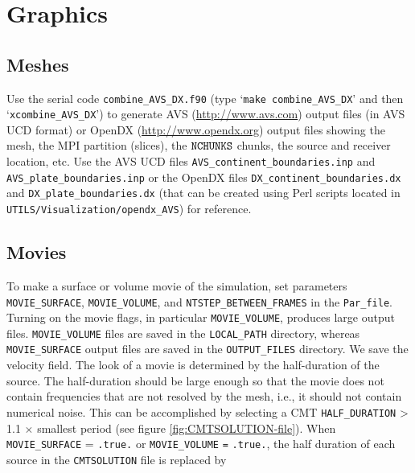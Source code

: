 \documentclass[oneside,english]{book}
\newcommand{\urlwithparentheses}[1]{(\url{#1})}
\newcommand{\nchunks}{\mbox{\texttt{NCHUNKS}}}
\begin{document}


\chapter{\label{cha:graphics}Graphics}


\section{\label{sec:Meshes}Meshes}

Use the serial code \texttt{combine\_AVS\_DX.f90} (type `\texttt{make
combine\_AVS\_DX}' and then `\texttt{xcombine\_AVS\_DX}') to generate
AVS \urlwithparentheses{http://www.avs.com} output files (in AVS UCD format) or OpenDX \urlwithparentheses{http://www.opendx.org}
output files showing the mesh, the MPI partition (slices), the $\nchunks$
chunks, the source and receiver location, etc. Use the AVS UCD files
\texttt{AVS\_continent\_boundaries.inp} and \texttt{AVS\_plate\_boundaries.inp}
or the OpenDX files \texttt{DX\_continent\_boundaries.dx} and \texttt{DX\_plate\_boundaries.dx}
(that can be created using Perl scripts located in \texttt{UTILS/Visualization/opendx\_AVS})
for reference.


\section{\label{sec:Movies}Movies}

To make a surface or volume movie of the simulation, set parameters
\texttt{MOVIE\_SURFACE}, \texttt{MOVIE\_VOLUME}, and \texttt{NTSTEP\_BETWEEN\_FRAMES}
in the \texttt{Par\_file}. Turning on the movie flags, in particular
\texttt{MOVIE\_VOLUME}, produces large output files. \texttt{MOVIE\_VOLUME}
files are saved in the \texttt{LOCAL\_PATH} directory, whereas \texttt{MOVIE\_SURFACE}
output files are saved in the \texttt{OUTPUT\_FILES} directory. We
save the velocity field. The look of a movie is determined by the
half-duration of the source. The half-duration should be large enough
so that the movie does not contain frequencies that are not resolved
by the mesh, i.e., it should not contain numerical noise. This can
be accomplished by selecting a CMT \texttt{HALF\_DURATION} > 1.1 $\times$
smallest period (see figure \ref{fig:CMTSOLUTION-file}). When \texttt{\small MOVIE\_SURFACE}
= \texttt{\small .true.} or \texttt{\small MOVIE\_VOLUME}{\small{}
}\texttt{\small =}{\small{} }\texttt{\small .true.}, the half duration
of each source in the \texttt{CMTSOLUTION} file is replaced by
\end{document}

